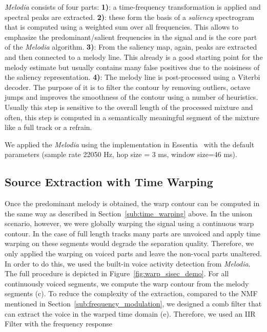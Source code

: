 \emph{Melodia} consists of four parts:
\noindent\textbf{1)}: a time-frequency transformation is applied and spectral peaks are extracted.
\textbf{2)}: these form the basis of a \emph{saliency} spectrogram that is computed using a weighted sum over all frequencies. This allows to emphasize the predominant/salient frequencies in the signal and is the core part of the \emph{Melodia} algorithm.
\textbf{3)}: From the saliency map, again, peaks are extracted and then connected to a melody line. This already is a good starting point for the melody estimate but  usually contains many false positives due to the noisiness of the saliency representation.
\textbf{4)}: The melody line is post-processed using a Viterbi decoder.
The purpose of it is to filter the contour by removing outliers, octave jumps and  improves the smoothness of the contour using a number of heuristics.
Usually this step is sensitive to the overall length of the processed mixture and often, this step is computed in a semantically meaningful segment of the mixture like a full track or a refrain.
\par
We applied the \emph{Melodia} using the implementation in Essentia~\cite{bogdanov13} with the default parameters (sample rate 22050 Hz, hop size = 3 ms, window size=46 ms).

\subsection{Source Extraction with Time Warping}

Once the predominant melody is obtained, the warp contour can be computed in the same way as described in Section~\ref{sub:time_warping} above.
In the unison scenario, however, we were globally warping the signal using a continuous warp contour.
In the case of full length tracks many parts are unvoiced and apply time warping on these segments would degrade the separation quality.
Therefore, we only applied the warping on voiced parts and leave the non-vocal parts unaltered.
In order to do this, we used the built-in voice activity detection from \emph{Melodia}.
The full procedure is depicted in Figure~\ref{fig:warp_sisec_demo}.
For all continuously voiced segments, we compute the warp contour from the melody segments (c).
To reduce the complexity of the extraction, compared to the NMF mentioned in Section~\ref{sub:frequency_modulation}, we designed a comb filter that can extract the voice in the warped time domain (e).
Therefore, we used an IIR Filter with the frequency response

